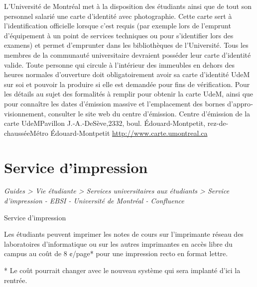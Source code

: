 \documentclass [12 pt]{article}
\begin{document}
            L'Université de Montréal met à la disposition des étudiants ainsi que de tout son
                personnel salarié une carte d'identité avec photographie. Cette carte sert à
                l'identification officielle lorsque c'est requis (par exemple lors de
                    l'emprunt d'équipement à un point de services techniques ou pour s'identifier
                    lors des examens) et permet d'emprunter dans les bibliothèques de
                l'Université. Tous les membres de la communauté universitaire devraient posséder
                leur carte d'identité valide. Toute personne qui circule à l'intérieur des immeubles
                en dehors des heures normales d'ouverture doit obligatoirement avoir sa carte
                d'identité UdeM sur soi et pouvoir la produire si elle est demandée pour fins de
                vérification.
            Pour les détails au sujet des formalités à remplir pour
                obtenir la carte UdeM, ainsi que pour connaître les dates d’émission massive et
                l’emplacement des bornes d’appro­visionnement, consulter le site web du centre
                d’émission.
            Centre d’émission de la
                    carte UdeMPavillon J.‑A.‑DeSève,2332, boul.
                Édouard-Montpetit, rez-de-chausséeMétro Édouard-Montpetit
        \href{
        http://www.carte.umontreal.ca
        } {
        http://www.carte.umontreal.ca
        }
    
        
    
    
        \newpage
        \section {
        Service d'impression
        }
        
        
        
        \textit{
        Guides > Vie étudiante > Services universitaires aux étudiants > Service
            d'impression - EBSI - Université de Montréal - Confluence
        }
    
        Service d'impression
        
            Les étudiants peuvent imprimer les notes de cours sur l’imprimante réseau des
                laboratoires d’informatique ou sur les autres imprimantes en accès libre du campus
                au coût de 8 ¢/page* pour une impression recto en format lettre.
        
        
            
            
                *
                Le coût pourrait changer avec le nouveau système qui sera implanté d’ici la
                    rentrée.
            
\end{document}
